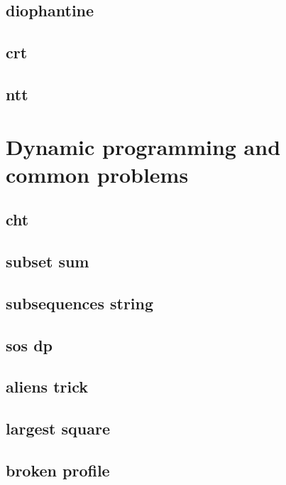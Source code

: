 \subsection{diophantine}
\raggedbottom
\hrulefill
\subsection{crt}
\raggedbottom
\hrulefill
\subsection{ntt}
\raggedbottom
\hrulefill

\section{Dynamic programming and common problems}
\subsection{cht}
\raggedbottom
\hrulefill
\subsection{subset sum}
\raggedbottom
\hrulefill
\subsection{subsequences string}
\raggedbottom
\hrulefill
\subsection{sos dp}
\raggedbottom
\hrulefill
\subsection{aliens trick}
\raggedbottom
\hrulefill
\subsection{largest square}
\raggedbottom
\hrulefill
\subsection{broken profile}
\raggedbottom
\hrulefill
